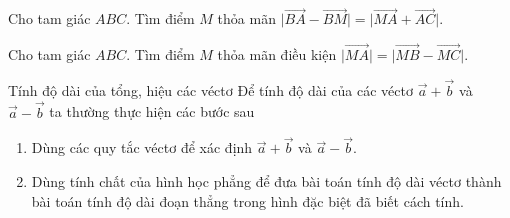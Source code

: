 \begin{vd}%
    Cho  tam giác $ABC$. Tìm điểm $M$ thỏa mãn $\vert\vec{BA}-\vec{BM}\vert =\vert\vec{MA}+\vec{AC}\vert$.
\end{vd}
%
\begin{vd}%
    Cho tam giác $ABC$. Tìm điểm $M$ thỏa mãn điều kiện $\vert\vec{MA}\vert=\vert\vec{MB}-\vec{MC}\vert$.
\end{vd}

\begin{dang}{Tính độ dài của tổng, hiệu các véctơ}
    Để tính độ dài của các véctơ $\vec{a}+\vec{b}$ và $\vec{a}-\vec{b}$ ta thường thực hiện các bước sau
\begin{enumerate}[Bước 1.]
    \item Dùng các quy tắc véctơ để xác định $\vec{a}+\vec{b}$ và $\vec{a}-\vec{b}$.
        \item Dùng tính chất của hình học phẳng để đưa bài toán tính độ dài véctơ thành bài toán tính độ dài đoạn thẳng trong hình đặc biệt đã biết cách tính.
    \end{enumerate}
\end{dang}

